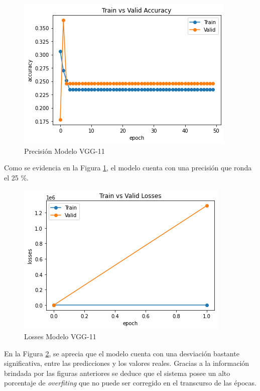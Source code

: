 			\begin{figure}[ht]
				\centering
				\includegraphics[scale=0.5]{Figs/105.png}
				\caption{Precisión Modelo VGG-11}
				\label{fig:precision_VGG11}
			\end{figure}
			
			Como se evidencia en la Figura \ref{fig:precision_VGG11}, el modelo cuenta con una precisión que ronda el 25 \%.
			\begin{figure}[ht]
				\centering
				\includegraphics[scale=0.5]{Figs/106.png}
				\caption{Losses Modelo VGG-11}
				\label{fig:loses_VGG11}
			\end{figure}
			
			En la Figura \ref{fig:loses_VGG11}, se aprecia que el modelo cuenta con una desviación bastante significativa, entre las predicciones y los valores reales. Gracias a la información brindada por las figuras anteriores se deduce que el sistema posee un alto porcentaje de \textit{overfiting} que no puede ser corregido en el transcurso de las épocas.
			
